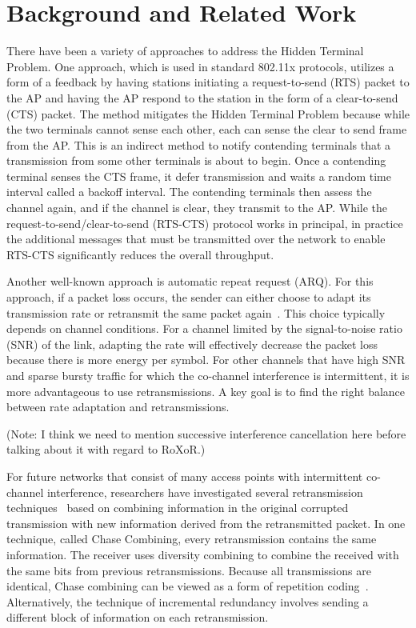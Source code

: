\section{Background and Related Work}
\label{s:related}

There have been a variety of approaches to address the Hidden Terminal Problem. One approach, which is used in 
standard 802.11x protocols, utilizes a form of a feedback by having stations initiating a request-to-send (RTS) packet to the AP and having the AP respond to the station in the form of a clear-to-send (CTS) packet. The method 
mitigates the Hidden Terminal Problem because while the two terminals cannot sense each other, each can sense the clear to send frame from the AP. This is an indirect method to notify contending terminals that a transmission from some other terminals is about to begin. Once a contending terminal senses the CTS frame, it defer transmission and waits a random time interval called a backoff interval. The contending terminals then assess the channel again, and if the channel is clear, they transmit to the AP.  While the request-to-send/clear-to-send (RTS-CTS) protocol works in principal, in practice the additional messages that must be transmitted over the network to enable RTS-CTS significantly reduces the overall throughput.
	
Another well-known approach is automatic repeat request (ARQ). For this approach, if a packet loss occurs, the sender can either choose to adapt its transmission rate or retransmit the same packet again~\cite{80211_spec}. This choice typically depends on channel conditions. For a channel limited by the signal-to-noise ratio (SNR) of the link, adapting the rate will effectively decrease the packet loss because there is more energy per symbol. For other channels that have high SNR and sparse bursty traffic for which the co-channel interference is intermittent, it is more advantageous to use retransmissions. A key goal is to find the right balance between rate adaptation and retransmissions. 

(Note: I think we need to mention successive interference cancellation here before talking about it with 
regard to RoXoR.)
 

For future networks that consist of many access points with intermittent co-channel interference,  researchers have investigated several retransmission techniques~\cite{hybridARQ} based on combining information in the original corrupted transmission with new information derived from the retransmitted packet. In one technique, called Chase Combining, every retransmission contains the same information. The receiver uses diversity combining to combine the received with the same bits from previous retransmissions. Because all transmissions are identical, Chase combining can be viewed as a form of repetition coding~\cite{chaseIR}. Alternatively, the technique of incremental redundancy involves sending a different block of information on each retransmission.   


